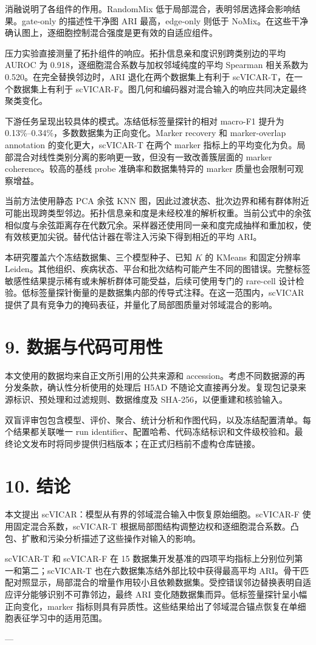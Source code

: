 \documentclass[journal]{IEEEtran}
\begin{document}
消融说明了各组件的作用。RandomMix 低于局部混合，表明邻居选择会影响结果。gate-only 的描述性干净图 ARI 最高，edge-only 则低于 NoMix。在这些干净确认图上，逐细胞控制混合强度是更有效的自适应组件。

压力实验直接测量了拓扑组件的响应。拓扑信息亲和度识别跨类别边的平均 AUROC 为 0.918，逐细胞混合系数与加权邻域纯度的平均 Spearman 相关系数为 0.520。在完全替换邻边时，ARI 退化在两个数据集上有利于 scVICAR-T，在一个数据集上有利于 scVICAR-F。图几何和编码器对混合输入的响应共同决定最终聚类变化。

下游任务呈现出较具体的模式。冻结低标签量探针的相对 macro-F1 提升为 0.13\%–0.34\%，多数数据集为正向变化。Marker recovery 和 marker-overlap annotation 的变化更大，scVICAR-T 在两个 marker 指标上的平均变化为负。局部混合对线性类别分离的影响更一致，但没有一致改善簇层面的 marker coherence。较高的基线 probe 准确率和数据集特异的 marker 质量也会限制可观察增益。

当前方法使用静态 PCA 余弦 KNN 图，因此过渡状态、批次边界和稀有群体附近可能出现跨类型邻边。拓扑信息亲和度是未经校准的解析权重。当前公式中的余弦相似度与余弦距离存在代数冗余。采样器还使用同一亲和度完成抽样和重加权，使有效核更加尖锐。替代估计器在零注入污染下得到相近的平均 ARI。

本研究覆盖六个冻结数据集、三个模型种子、已知 $K$ 的 KMeans 和固定分辨率 Leiden。其他组织、疾病状态、平台和批次结构可能产生不同的图错误。完整标签敏感性结果提示稀有或未解析群体可能受益，后续可使用专门的 rare-cell 设计检验。低标签量探针衡量的是数据集内部的传导式注释。在这一范围内，scVICAR 提供了具有竞争力的掩码表征，并量化了局部图质量对邻域混合的影响。

\section{9. 数据与代码可用性}

本文使用的数据均来自正文所引用的公共来源和 accession。考虑不同数据源的再分发条款，确认性分析使用的处理后 H5AD 不随论文直接再分发。复现包记录来源标识、预处理和过滤规则、数据维度及 SHA-256，以便重建和核验输入。

双盲评审包包含模型、评价、聚合、统计分析和作图代码，以及冻结配置清单。每个结果都关联唯一 run identifier、配置哈希、代码冻结标识和文件级校验和。最终论文发布时将同步提供归档版本；在正式归档前不虚构仓库链接。

\section{10. 结论}

本文提出 scVICAR：模型从有界的邻域混合输入中恢复原始细胞。scVICAR-F 使用固定混合系数，scVICAR-T 根据局部图结构调整边权和逐细胞混合系数。凸包、扩散和污染分析描述了这些操作对输入的影响。

scVICAR-T 和 scVICAR-F 在 15 数据集开发基准的四项平均指标上分别位列第一和第二；scVICAR-T 也在六数据集冻结外部比较中获得最高平均 ARI。骨干匹配对照显示，局部混合的增量作用较小且依赖数据集。受控错误邻边替换表明自适应评分能够识别不可靠邻边，最终 ARI 变化随数据集而异。低标签量探针呈小幅正向变化，marker 指标则具有异质性。这些结果给出了邻域混合锚点恢复在单细胞表征学习中的适用范围。

---
\end{document}
